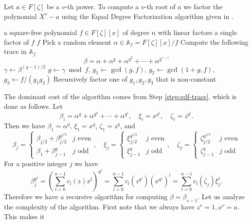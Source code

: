 \documentclass[12pt]{article}
\theoremstyle{plain}
\theoremstyle{definition}
\newcounter{algorithm}
\begin{document}
Let $a \in F[\zeta]$ be a $v$-th power. To compute a $v$-th root of $a$ we factor the 
polynomial $X^v - a$ using the Equal Degree Factorization algorithm given in 
\cite{kaltofen+shoup97}.
\begin{algorithm}
	\label{algorithm:edf}
	\begin{algorithmic}[1]
		\REQUIRE a square-free polynomial $f \in F[\zeta][x]$ of degree $n$ with linear factors
		\ENSURE a single factor of $f$
		\RETURN $f$
		\ENDIF
		\STATE Pick a random element $\alpha \in \mathbb{A}_f = F[\zeta][x]/f$
		\STATE\label{step:edf-trace} Compute the following trace in $\mathbb{A}_f$
		\[ \beta = \alpha + \alpha^q + \alpha^{q^2} + \cdots + \alpha^{q^{s - 1}} \]
		\STATE $\gamma \leftarrow \beta^{(q - 1) / 2}$
		\STATE $g \leftarrow \gamma \bmod f$, $g_1 \leftarrow \gcd(g, f)$, $g_2 \leftarrow \gcd(1 + 
		g, f)$, $g_3 \leftarrow f/(g_1g_2)$
		\STATE Recursively factor one of $g_1, g_2, g_3$ that is non-constant
	\end{algorithmic}
\end{algorithm}
The dominant cost of the algorithm comes from Step \ref{step:edf-trace}, which is done as follows. 
Let
\[ \beta_i = \alpha^q + \alpha^{q^2} + \cdots + \alpha^{q^i}, \quad \xi_i = x^{q^i}, \quad \zeta_i 
= z^{q^i}. \]
Then we have $\beta_1 = \alpha^q$, $\xi_1 = x^q$, $\zeta_1 = z^q$, and
\[
\beta_j = 
\begin{cases}
\beta_{j / 2} + \beta_{j / 2}^{q^{j / 2}} & j \text{ even} \\
\beta_1 + \beta_{j - 1}^q & j \text{ odd}
\end{cases}, \quad
\xi_j = 
\begin{cases}
\xi_{j / 2}^{q^{j / 2}} & j \text{ even} \\
\xi_{j - 1}^q & j \text{ odd}
\end{cases}, \quad
\zeta_j = 
\begin{cases}
\zeta_{j / 2}^{q^{j / 2}} & j \text{ even} \\
\zeta_{j - 1}^q & j \text{ odd}
\end{cases}
\]
For a positive integer $j$ we have
\begin{equation}
\label{equation:betaj}
\beta_j^{q^j} = \left( \sum_{l = 0}^{n - 1}c_l(z)x^l \right)^{q^j} = \sum_{l = 0}^{n - 
	1}c_l(z^{q^j})(x^{q^j})^l = \sum_{l = 0}^{n - 1}c_l(\zeta_j)\xi_j^l.
\end{equation}
Therefore we have a recursive algorithm for computing $\beta = \beta_{s - 1}$. Let us analyze the 
complexity of the algorithm. First note that we always have $z^v = 1, x^v = a$. This makes it 
\end{document}
